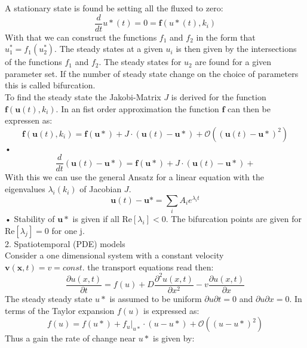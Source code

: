 \documentclass[hyperref]{labbook}
\numberwithin{equation}{experiment}
\numberwithin{table}{experiment}
\numberwithin{figure}{experiment}
\begin{document}
A stationary state is found be setting all the fluxed to zero:
\begin{equation}
\frac{d}{dt}  u*(t) = 0 = \mathbf f (  u* (t) , k_i)
\end{equation}
With that we can construct the functions $f_1$ and $f_2$ in the form that $u^*_1 = f_1(u_2^*)$. The steady states at a given $u_i$ is then given by the intersections of the functions $f_1$ and $f_2$. The steady states for $u_2$ are found for a given parameter set. If the number of steady state change on the choice of parameters this is called bifurcation. \\
To find the steady state the Jakobi-Matrix $J$ is derived for the function $\mathbf f(\mathbf u (t), k_i)$. In an fist order approximation the function $\mathbf f $ can then be expressen as:
\begin{equation}
 \mathbf f(\mathbf u (t), k_i) =  \mathbf f( \mathbf u*)  + J\cdot(\mathbf u (t) - \mathbf u*) + \mathcal O ((\mathbf u(t) - \mathbf u*)^2)
\end{equation}•
 \begin{equation}
 \frac{d}{dt} (\mathbf u(t) - \mathbf u*)=  \mathbf f( \mathbf u*)  + J\cdot(\mathbf u (t) - \mathbf u*) + 
\end{equation}
With this we can use the general Ansatz  for a linear equation with the  eigenvalues $\lambda_i(k_i)$ of Jacobian $J$.
\begin{equation}
\mathbf u(t) - \mathbf u* = \sum_iA_i e^{\lambda_i t}
\end{equation}•
Stability of $\mathbf u*$ is given if all $\mathrm{Re}[\lambda_i]<0$. The bifurcation points are given for $\mathrm{Re}[\lambda_j]=0$ for one j. \\[1em]
2. Spatiotemporal (PDE) models \\
Consider a one dimensional system with a constant velocity $\mathbf v (\mathbf x ,t ) = v = const.$ the transport equations read then: 
\begin{equation}
\frac{\partial u(x,t)}{\partial t} = f(u) + D\frac{\partial^2 u(x,t)}{\partial x^2} - v   \frac{\partial u(x,t)}{\partial x}
\end{equation}
The steady steady state $u*$ is assumed to be uniform ${\partial u}{\partial t} = 0$ and ${\partial u}{\partial x} = 0$. In terms of the Taylor expansion $f(u)$ is expressed as:
\begin{equation}
f(u) = f(u*) + f_u|_{u*} \cdot (u-u*) + \mathcal{O}((u-u*)^2)
\end{equation}
Thus a gain the rate of change near $u*$ is given by:
\end{document}

